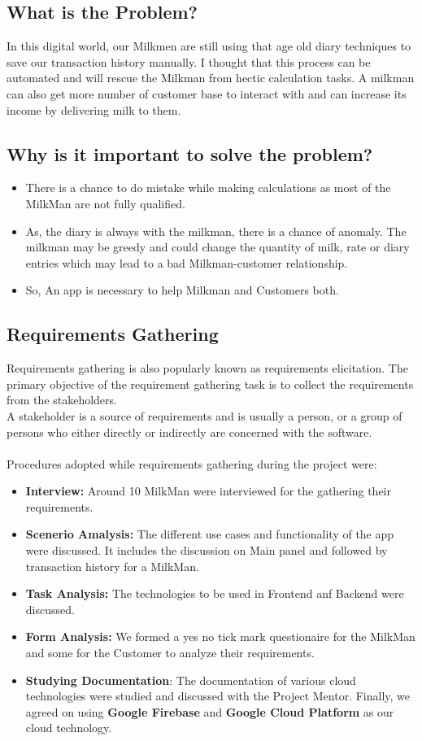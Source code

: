\subsection{What is the Problem?}
In this digital world, our Milkmen are still using that age old diary techniques to save our transaction history manually. I thought that this process can be automated and will rescue the Milkman from hectic calculation tasks. A milkman can also get more number of customer base to interact with and can increase its income by delivering milk to them.
\subsection{Why is it important to solve the problem?}
\begin{itemize}
	\item There is a chance to do mistake while making calculations as most of the MilkMan are not fully qualified.
	\item As, the diary is always with the milkman, there is a chance of anomaly. The milkman may be greedy and could change the quantity of milk, rate or diary entries which may lead to a bad Milkman-customer relationship.
	\item So, An app is necessary to help Milkman and Customers both.  
\end{itemize}
  
\subsection{Requirements Gathering}
Requirements gathering is also popularly known as requirements elicitation. The primary objective of the requirement gathering task is to collect the requirements from the stakeholders.\\
A stakeholder is a source of requirements and is usually a person, or a group of persons who either directly or indirectly are concerned with the software.\\
\\
Procedures adopted while requirements gathering during the project were:
\begin{itemize}
	\item \textbf{Interview:} Around 10 MilkMan were interviewed for the gathering their requirements.
	\item \textbf{Scenerio Amalysis:} The different use cases and functionality of the app were discussed. It includes the discussion on Main panel and followed by transaction history for a MilkMan.
	\item \textbf{Task Analysis:} The technologies to be used in Frontend anf Backend were discussed.
	\item \textbf{Form Analysis:} We formed a yes no tick mark questionaire for the MilkMan and some for the Customer to analyze their requirements.
	\item \textbf{Studying Documentation}: The documentation of various cloud technologies were studied and discussed with the Project Mentor. Finally, we agreed on using \textbf{Google Firebase} and \textbf{Google Cloud Platform} as our cloud technology.
\end{itemize}

